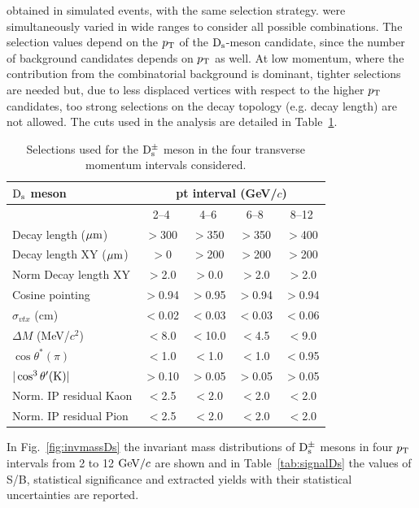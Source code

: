    obtained in simulated events, with the same selection strategy.
were simultaneously varied in wide ranges to consider all possible combinations. 
The selection values depend on the $p_{\rm T}$ of the ${\rm D_s}$-meson candidate, since
the number of background candidates depends on $p_{\rm T}$ as well.
At low momentum, where the contribution from the combinatorial
background is dominant, tighter selections are needed but, due to less displaced 
vertices with respect to the higher $p_{\rm T}$ candidates, too strong selections
on the decay topology (e.g. decay length) are not allowed.
The cuts used in the analysis are detailed in Table~\ref{tab:cutsDs}.
\begin{table}[tbh!]
\centering
\begin{tabular}{|l|c|c|c|c|} 
\hline 
 ${\rm D_s}$ meson& \multicolumn{4}{c|}{pt interval (GeV/$c$)}\\
\hline
 & 2--4  & 4--6 & 6--8 & 8--12\\
\hline
Decay length ($\mathrm{\mu m}$)        & $>$300 & $>$350 & $>$350 & $>$400\\
Decay length XY ($\mathrm{\mu m}$)     & $>$0 & $>$200 & $>$200 & $>$200\\
Norm Decay length XY          & $>$2.0& $>$0.0 & $>$2.0 & $>$2.0\\
Cosine pointing              & $>$0.94 & $>$0.95 & $>$0.94 & $>$0.94\\
$\sigma_{vtx}$  (cm)          & $<$0.02 & $<$0.03 & $<$0.03 & $<$0.06\\
$\Delta M$ (MeV/$c^{2}$) & $<$8.0 & $<$10.0 & $<$4.5 & $<$9.0\\
$\cos \theta^*(\pi)$    & $<$1.0 & $<$1.0 & $<$1.0 & $<$0.95\\
$|\cos^3 \theta^\prime({\rm K})|$        & $>$0.10 & $>$0.05 & $>$0.05 & $>$0.05\\
Norm. IP residual Kaon  & $<$2.5 & $<$2.0 & $<$2.0 & $<$2.0 \\
Norm. IP residual Pion  & $<$2.5 & $<$2.0 & $<$2.0 & $<$2.0 \\[1ex]
\hline
\end{tabular}
\caption{Selections used for the ${\rm D_s^{\pm}}$ meson in the four transverse momentum intervals considered.} 
\label{tab:cutsDs}
\end{table}
In Fig.~\ref{fig:invmassDs} the invariant mass distributions 
of ${\rm D_s^{\pm}}$ mesons in four $p_{\rm T}$ intervals from 2 to 12 $\mathrm{GeV}/c$ are shown 
and in Table~\ref{tab:signalDs} the values of S/B, statistical significance and extracted yields 
with their statistical uncertainties are reported.
